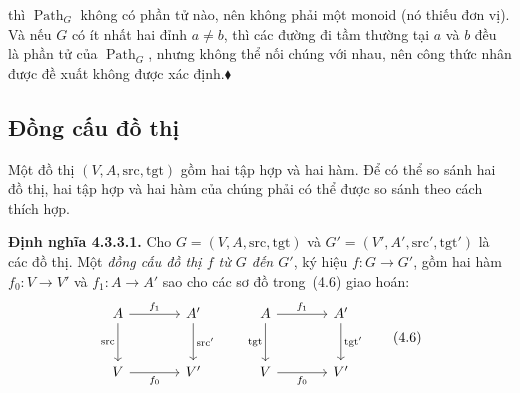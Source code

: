 thì $\operatorname{Path}_G$ không có phần tử nào, nên không phải một monoid (nó thiếu đơn vị). Và nếu $G$ có ít nhất hai đỉnh $a\ne b$, thì các đường đi tầm thường tại $a$ và $b$ đều là phần tử của $\operatorname{Path}_G$, nhưng không thể nối chúng với nhau, nên công thức nhân được đề xuất không được xác định.\hfill$\blacklozenge$

\subsection{Đồng cấu đồ thị}

Một đồ thị $(V,A,\mathrm{src},\mathrm{tgt})$ gồm hai tập hợp và hai hàm. Để có thể so sánh hai đồ thị, hai tập hợp và hai hàm của chúng phải có thể được so sánh theo cách thích hợp.

\noindent\textbf{Định nghĩa 4.3.3.1.} Cho $G=(V,A,\mathrm{src},\mathrm{tgt})$ và $G'=(V',A',\mathrm{src}',\mathrm{tgt}')$ là các đồ thị. Một \emph{đồng cấu đồ thị $f$ từ $G$ đến $G'$}, ký hiệu $f:G\to G'$, gồm hai hàm $f_0:V\to V'$ và $f_1:A\to A'$ sao cho các sơ đồ trong~(4.6) giao hoán:
\begin{equation}
\begin{tikzcd}[column sep=large,row sep=large]
A\arrow[r,"f_1"]\arrow[d,"\mathrm{src}"']&A'\arrow[d,"\mathrm{src}'"]\\
V\arrow[r,"f_0"']&V'
\end{tikzcd}
\qquad
\begin{tikzcd}[column sep=large,row sep=large]
A\arrow[r,"f_1"]\arrow[d,"\mathrm{tgt}"']&A'\arrow[d,"\mathrm{tgt}'"]\\
V\arrow[r,"f_0"']&V'
\end{tikzcd}
\tag{4.6}
\end{equation}

